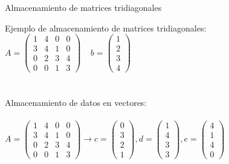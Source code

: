 \documentclass [8pt] {beamer}
\begin{document}
        \begin{frame}{Almacenamiento de matrices tridiagonales}
            \begin{exampleblock}{Ejemplo de almacenamiento de matrices tridiagonales:}
                {$A = \left( \begin{array}{cccc}
                1 & 4 & 0 & 0\\
                3 & 4 & 1 & 0\\
                0 & 2 & 3 & 4\\
                0 & 0 & 1 & 3
                \end{array} \right) \ \ \ \ \  b = \left( \begin{array}{l}
                1\\  2\\  3\\  4
                \end{array} \right)$} \\ \ \\ \ \\ Almacenamiento de datos en vectores: \\ \ \\
                {$A = \left( \begin{array}{cccc}
                1 & 4 & 0 & 0\\
                3 & 4 & 1 & 0\\
                0 & 2 & 3 & 4\\
                0 & 0 & 1 & 3
                \end{array} \right) \rightarrow c = \left( \begin{array}{l}
                0\\  3\\  2\\  1
                \end{array} \right) , d = \left( \begin{array}{l}
                1\\  4\\  3\\  3
                \end{array} \right), e = \left( \begin{array}{l}
                4\\  1\\  4\\  0
                \end{array} \right)$} \\ \ \\ 
            \end{exampleblock}
        \end{frame}
\end{document}
